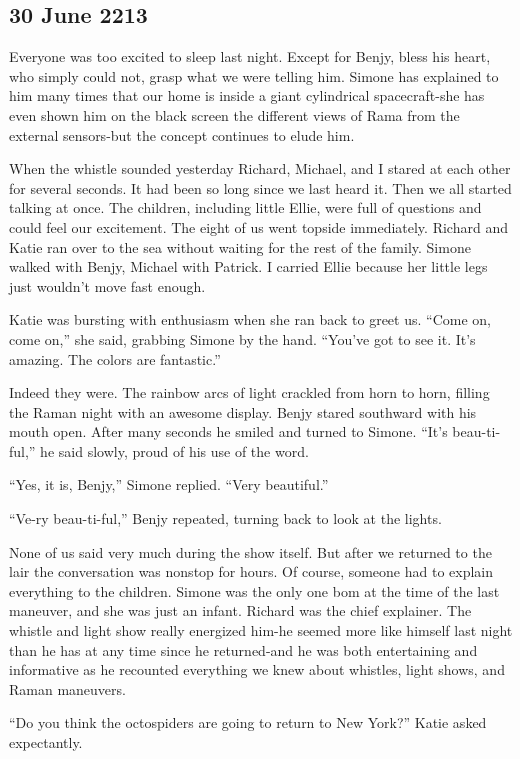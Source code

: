 \documentclass[]{article}
\begin{document}
{\subsection*{30 June 2213}

Everyone was too excited to sleep last night.  Except for Benjy, bless his heart, who simply could not, grasp what we were telling him.  Simone has explained to him many times that our home is inside a giant cylindrical spacecraft-she has even shown him on the black screen the different views of Rama from the external sensors-but the concept continues to elude him.

When the whistle sounded yesterday Richard, Michael, and I stared at each other for several seconds.  It had been so long since we last heard it.  Then we all started talking at once.  The children, including little Ellie, were full of questions and could feel our excitement.  The eight of us went topside immediately.  Richard and Katie ran over to the sea without waiting for the rest of the family.  Simone walked with Benjy, Michael with Patrick.  I carried Ellie because her little legs just wouldn’t move fast enough.

Katie was bursting with enthusiasm when she ran back to greet us.  “Come on, come on,” she said, grabbing Simone by the hand.  “You’ve got to see it.  It’s amazing.  The colors are fantastic.”

Indeed they were.  The rainbow arcs of light crackled from horn to horn, filling the Raman night with an awesome display.  Benjy stared southward with his mouth open.  After many seconds he smiled and turned to Simone.  “It’s beau-ti-ful,” he said slowly, proud of his use of the word.

“Yes, it is, Benjy,” Simone replied.  “Very beautiful.”

“Ve-ry beau-ti-ful,” Benjy repeated, turning back to look at the lights.

None of us said very much during the show itself.  But after we returned to the lair the conversation was nonstop for hours.  Of course, someone had to explain everything to the children.  Simone was the only one bom at the time of the last maneuver, and she was just an infant.  Richard was the chief explainer.  The whistle and light show really energized him-he seemed more like himself last night than he has at any time since he returned-and he was both entertaining and informative as he recounted everything we knew about whistles, light shows, and Raman maneuvers.

“Do you think the octospiders are going to return to New York?” Katie asked expectantly.

}
\end{document}
